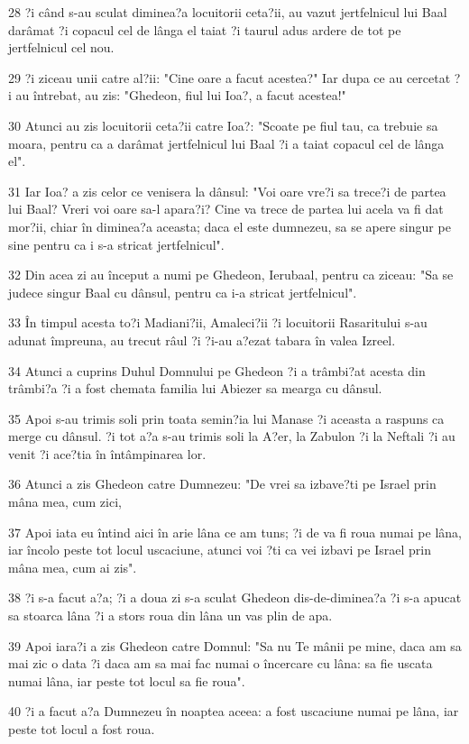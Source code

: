 \par 28 ?i când s-au sculat diminea?a locuitorii ceta?ii, au vazut jertfelnicul lui Baal darâmat ?i copacul cel de lânga el taiat ?i taurul adus ardere de tot pe jertfelnicul cel nou.
\par 29 ?i ziceau unii catre al?ii: "Cine oare a facut acestea?" Iar dupa ce au cercetat ?i au întrebat, au zis: "Ghedeon, fiul lui Ioa?, a facut acestea!"
\par 30 Atunci au zis locuitorii ceta?ii catre Ioa?: "Scoate pe fiul tau, ca trebuie sa moara, pentru ca a darâmat jertfelnicul lui Baal ?i a taiat copacul cel de lânga el".
\par 31 Iar Ioa? a zis celor ce venisera la dânsul: "Voi oare vre?i sa trece?i de partea lui Baal? Vreri voi oare sa-l apara?i? Cine va trece de partea lui acela va fi dat mor?ii, chiar în diminea?a aceasta; daca el este dumnezeu, sa se apere singur pe sine pentru ca i s-a stricat jertfelnicul".
\par 32 Din acea zi au început a numi pe Ghedeon, Ierubaal, pentru ca ziceau: "Sa se judece singur Baal cu dânsul, pentru ca i-a stricat jertfelnicul".
\par 33 În timpul acesta to?i Madiani?ii, Amaleci?ii ?i locuitorii Rasaritului s-au adunat împreuna, au trecut râul ?i ?i-au a?ezat tabara în valea Izreel.
\par 34 Atunci a cuprins Duhul Domnului pe Ghedeon ?i a trâmbi?at acesta din trâmbi?a ?i a fost chemata familia lui Abiezer sa mearga cu dânsul.
\par 35 Apoi s-au trimis soli prin toata semin?ia lui Manase ?i aceasta a raspuns ca merge cu dânsul. ?i tot a?a s-au trimis soli la A?er, la Zabulon ?i la Neftali ?i au venit ?i ace?tia în întâmpinarea lor.
\par 36 Atunci a zis Ghedeon catre Dumnezeu: "De vrei sa izbave?ti pe Israel prin mâna mea, cum zici,
\par 37 Apoi iata eu întind aici în arie lâna ce am tuns; ?i de va fi roua numai pe lâna, iar încolo peste tot locul uscaciune, atunci voi ?ti ca vei izbavi pe Israel prin mâna mea, cum ai zis".
\par 38 ?i s-a facut a?a; ?i a doua zi s-a sculat Ghedeon dis-de-diminea?a ?i s-a apucat sa stoarca lâna ?i a stors roua din lâna un vas plin de apa.
\par 39 Apoi iara?i a zis Ghedeon catre Domnul: "Sa nu Te mânii pe mine, daca am sa mai zic o data ?i daca am sa mai fac numai o încercare cu lâna: sa fie uscata numai lâna, iar peste tot locul sa fie roua".
\par 40 ?i a facut a?a Dumnezeu în noaptea aceea: a fost uscaciune numai pe lâna, iar peste tot locul a fost roua.


